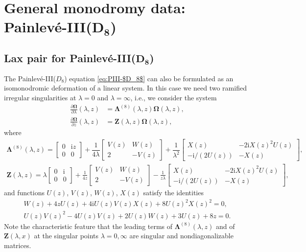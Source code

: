 \documentclass[pdftex]{sigma}
\numberwithin{equation}{section}
\newcommand{\ii}{\mathrm{i}}
\begin{document}
\section[General monodromy data: Painlev\'e-III(D\_8)]{General monodromy data: Painlev\'e-III($\boldsymbol{D_8}$)} \label{sec:monodromy-rep-$D_8$}

\subsection[Lax pair for Painlev\'e-III(D\_8)]{Lax pair for Painlev\'e-III($\boldsymbol{D_8}$)}
\label{sec:lax-pair-$D_8$}

The Painlev\'e-III($D_8$) equation \eqref{eq:PIII-$D_8$} can also be formulated as an isomonodromic deformation of a linear system. In this case we need two ramified irregular singularities at $\lambda = 0$ and $\lambda = \infty$, i.e., we consider the system
\begin{align}\label{eq:lax_pair_D8}
\frac{\partial\mathbf{\Omega}}{\partial\lambda} (\lambda, z) &= {\mathbf{\Lambda}}^{(8)}(\lambda, z) \mathbf{\Omega}(\lambda, z), \\
\frac{\partial\mathbf{\Omega}}{\partial z} (\lambda, z) &= {\mathbf{Z}}(\lambda, z) \mathbf{\Omega}(\lambda, z),
\label{eq:lax_pair_D8_2}
\end{align}
where
\begin{gather*}
{\mathbf{\Lambda}}^{(8)}(\lambda, z) = \begin{bmatrix}0&{\ii z}{} \\0&0\end{bmatrix} +\dfrac{1}{4\lambda}\begin{bmatrix}V(z) & {W}(z)\\2 & -V(z)\end{bmatrix} + \dfrac{1}{\lambda^2}\begin{bmatrix}X(z) & -2\ii X(z)^2U(z)\\-\ii/(2U(z)) & -X(z)\end{bmatrix},
\\
{\mathbf{Z}}(\lambda, z) = \lambda\begin{bmatrix}0& {\ii} \\0&0\end{bmatrix} + \frac{1}{4z}\begin{bmatrix}V(z) & W(z)\\2 & -V(z)\end{bmatrix} - \frac{1}{z\lambda}\begin{bmatrix}X(z) & -2\ii X(z)^2U(z)\\-\ii/(2U(z)) & -X(z)\end{bmatrix},
\end{gather*}
and functions $U(z)$, $V(z)$, $W(z)$, $X(z)$ satisfy the identities
\begin{gather}
 W(z) +4zU(z) +4\ii U(z)V(z)X(z) + 8 U(z )^2X(z)^2 =0,
 \label{eq:UVWXidentity1}\\
 U(z) V(z)^2-4 U(z) V(z)+2 U(z) W(z)+3 U(z)+8 z=0.\label{eq:UVWidentity1}
\end{gather}
Note the characteristic feature that the leading terms of $\mathbf{\Lambda}^{(8)}(\lambda,z)$ and of $\mathbf{Z}(\lambda,x)$ at the singular points $\lambda=0,\infty$ are singular and nondiagonalizable matrices.
\end{document}
